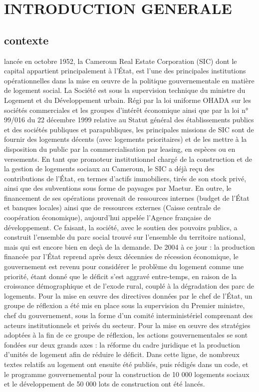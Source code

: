 \documentclass[english,12pt,a4paper]{report}
\begin{document}


\chapter*{INTRODUCTION GENERALE}
\vspace{0.8cm}

\section{contexte}
lancée en octobre 1952, la Cameroun Real Estate Corporation (SIC) dont le capital appartient principalement à l'État, est l'une des principales institutions opérationnelles dans la mise en œuvre de la politique gouvernementale en matière de logement social. La Société est sous la supervision technique du ministre du Logement et du Développement urbain. Régi par la loi uniforme OHADA sur les sociétés commerciales et les groupes d'intérêt économique ainsi que par la loi n° 99/016 du 22 décembre 1999 relative au Statut général des établissements publics et des sociétés publiques et parapubliques, les principales missions de SIC sont de fournir des logements décents (avec logements prioritaires) et de les mettre à la disposition du public par la commercialisation par leasing, en espèces ou en versements. En tant que promoteur institutionnel chargé de la construction et de la gestion de logements sociaux au Cameroun, le SIC a déjà reçu des contributions de l'État, en termes d'actifs immobiliers, tirés de son stock privé, ainsi que des subventions sous forme de paysages par Maetur. En outre, le financement de ses opérations provenait de ressources internes (budget de l'État et banques locales) ainsi que de ressources externes (Caisse centrale de coopération économique), 
aujourd'hui appelée l'Agence française de développement. Ce faisant, la société, avec le soutien des pouvoirs publics, a construit l'ensemble du parc social trouvé sur l'ensemble du territoire national, mais qui est encore bien en deçà de la demande. De 2004 à ce jour : la production financée par l'État reprend après deux décennies de récession économique, le gouvernement est revenu pour considérer le problème du logement comme une priorité, étant donné que le déficit s'est aggravé entre-temps, en raison de la croissance démographique et de l'exode rural, couplé à la dégradation des parc de logements. Pour la mise en œuvre des directives données par le chef de l'État, un groupe de réflexion a été mis en place sous la supervision du Premier ministre, chef du gouvernement, sous la forme d'un comité interministériel comprenant des acteurs institutionnels et privés du secteur. Pour la mise en œuvre des stratégies adoptées à la fin de ce groupe de réflexion, les actions gouvernementales se sont fondées sur deux grands axes : la réforme du cadre juridique et la production d'unités de logement afin de réduire le déficit. Dans cette ligne, de nombreux textes relatifs au logement ont ensuite été publiés, puis rédigés dans un code, et le programme gouvernemental pour la construction de 10 000 logements sociaux et le développement de 50 000 lots de construction ont été lancés. 
\end{document}
